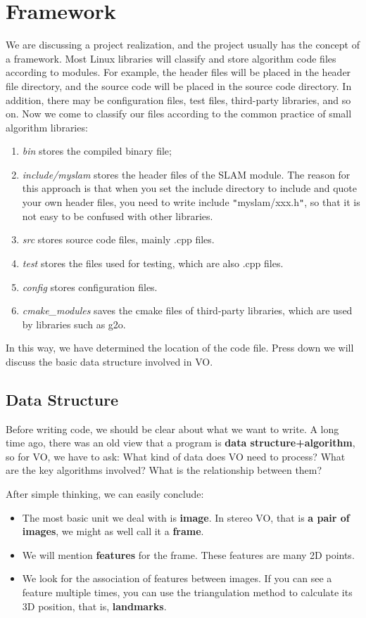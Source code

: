 \section{Framework}
We are discussing a project realization, and the project usually has the concept of a framework. Most Linux libraries will classify and store algorithm code files according to modules. For example, the header files will be placed in the header file directory, and the source code will be placed in the source code directory. In addition, there may be configuration files, test files, third-party libraries, and so on. Now we come to classify our files according to the common practice of small algorithm libraries:

\begin{enumerate}
	\item \textit{bin} stores the compiled binary file;
	\item \textit{include/myslam} stores the header files of the SLAM module. The reason for this approach is that when you set the include directory to include and quote your own header files, you need to write include \texttt{"}myslam/xxx.h\texttt{"}, so that it is not easy to be confused with other libraries.
	\item \textit{src} stores source code files, mainly .cpp files.
	\item \textit{test} stores the files used for testing, which are also .cpp files.
	\item \textit{config} stores configuration files.
	\item \textit{cmake\_modules} saves the cmake files of third-party libraries, which are used by  libraries such as g2o.
\end{enumerate}

In this way, we have determined the location of the code file. Press down we will discuss the basic data structure involved in VO.

\subsection{Data Structure}
Before writing code, we should be clear about what we want to write. A long time ago, there was an old view that a program is \textbf{data structure+algorithm}, so for VO, we have to ask: What kind of data does VO need to process? What are the key algorithms involved? What is the relationship between them?

After simple thinking, we can easily conclude:
\begin{itemize}
	\item The most basic unit we deal with is \textbf{image}. In stereo VO, that is \textbf{a pair of images}, we might as well call it a \textbf{frame}.
	\item We will mention \textbf{features} for the frame. These features are many 2D points.
	\item We look for the association of features between images. If you can see a feature multiple times, you can use the triangulation method to calculate its 3D position, that is, \textbf{landmarks}.
\end{itemize}

